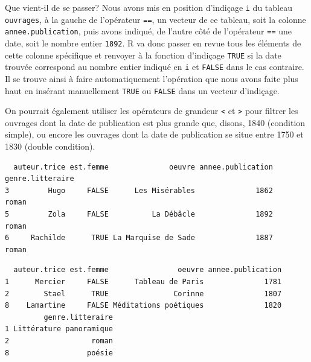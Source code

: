 \documentclass[
  letterpaper,
  DIV=11,
  numbers=noendperiod]{scrartcl}
\newenvironment{Shaded}{\begin{snugshade}}{\end{snugshade}}
\newcommand{\DecValTok}[1]{\textcolor[rgb]{0.68,0.00,0.00}{#1}}
\newcommand{\NormalTok}[1]{\textcolor[rgb]{0.00,0.23,0.31}{#1}}
\newcommand{\SpecialCharTok}[1]{\textcolor[rgb]{0.37,0.37,0.37}{#1}}
\begin{document}
Que vient-il de se passer? Nous avons mis en position d'indiçage
\texttt{i} du tableau \texttt{ouvrages}, à la gauche de l'opérateur
\texttt{==}, un vecteur de ce tableau, soit la colonne
\texttt{annee.publication}, puis avons indiqué, de l'autre côté de
l'opérateur \texttt{==} une date, soit le nombre entier \texttt{1892}. R
va donc passer en revue tous les éléments de cette colonne spécifique et
renvoyer à la fonction d'indiçage \texttt{TRUE} si la date trouvée
correspond au nombre entier indiqué en \texttt{i} et \texttt{FALSE} dans
le cas contraire. Il se trouve ainsi à faire automatiquement l'opération
que nous avons faite plus haut en insérant manuellement \texttt{TRUE} ou
\texttt{FALSE} dans un vecteur d'indiçage.

On pourrait également utiliser les opérateurs de grandeur
\texttt{\textless{}} et \texttt{\textgreater{}} pour filtrer les
ouvrages dont la date de publication est plus grande que, disons, 1840
(condition simple), ou encore les ouvrages dont la date de publication
se situe entre 1750 et 1830 (double condition).

\begin{Shaded}
\end{Shaded}

\begin{verbatim}
  auteur.trice est.femme              oeuvre annee.publication genre.litteraire
3         Hugo     FALSE      Les Misérables              1862            roman
5         Zola     FALSE          La Débâcle              1892            roman
6     Rachilde      TRUE La Marquise de Sade              1887            roman
\end{verbatim}

\begin{Shaded}
\end{Shaded}

\begin{verbatim}
  auteur.trice est.femme                oeuvre annee.publication
1      Mercier     FALSE      Tableau de Paris              1781
2        Stael      TRUE               Corinne              1807
8    Lamartine     FALSE Méditations poétiques              1820
         genre.litteraire
1 Littérature panoramique
2                   roman
8                  poésie
\end{verbatim}
\end{document}
